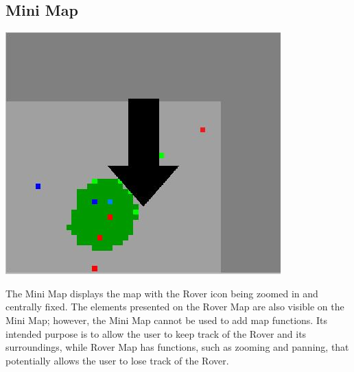 \documentclass[12pt]{article}
\begin{document}
	\subsection{Mini Map}
		\begin{center}
		\includegraphics[scale=1]{MiniMap.jpg}
		\end{center}
The Mini Map displays the map with the Rover icon being zoomed in and centrally fixed. The elements presented on the Rover Map are also visible on the Mini Map; however, the Mini Map cannot be used to add map functions. Its intended purpose is to allow the user to keep track of the Rover and its surroundings, while Rover Map has functions, such as zooming and panning, that  potentially allows the user to lose track of the Rover.
		
\end{document}
